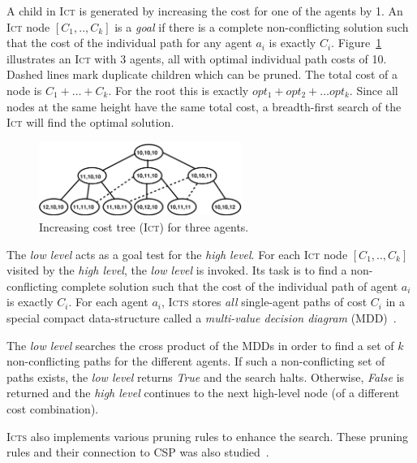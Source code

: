 \documentclass[jair,oneside,11pt]{article}
\begin{document}
A child in \textsc{Ict} is generated by increasing the cost for one of the agents by 1. An \textsc{Ict} node $[C_1,..,C_k]$ is a {\em goal} if there is a complete non-conflicting solution such that the cost of the
individual path for any agent $a_i$ is exactly $C_i$. Figure~\ref{figure-ICT}
illustrates an \textsc{Ict} with 3 agents, all with optimal individual path costs of 10.
Dashed lines mark duplicate children which can be pruned. The total cost of a
node is $C_1+ \ldots +C_k$. For the root this is exactly $opt_1
+ opt_2 + \ldots opt_k$. Since all nodes at the same height have the same total cost, a breadth-first search of
the \textsc{Ict} will find the optimal solution.

\begin{figure}
\begin{center}
\includegraphics*[height=2.4cm]{fig_ICT.pdf}
\end{center}
\vspace{-0.4cm}
\caption{Increasing cost tree (\textsc{Ict}) for three agents.} \label{figure-ICT}
\end{figure}

The \emph{low level} acts as a goal test for the \emph{high level}. For each
\textsc{Ict} node  $[C_1,..,C_k]$  visited by the \emph{high level}, the \emph{low level} is invoked.
Its task is to find a non-conflicting complete solution such that the cost of
the individual path of agent $a_i$ is exactly $C_i$. For each agent $a_i$, \textsc{Icts}
stores {\em all} single-agent paths of cost $C_i$ in a special compact
data-structure called a {\em multi-value decision diagram}
(MDD)~\cite{DBLP:conf/iccad/SrinivasanKMB90}.

The \emph{low level} searches the cross product of the MDDs in order to find a set of
$k$ non-conflicting paths for the different agents. If such a non-conflicting
set of paths exists, the \emph{low level} returns {\em True} and the search halts.
Otherwise, {\em False} is returned and the \emph{high level} continues to the next
high-level node (of a different cost combination).

\textsc{Icts} also implements various pruning rules to enhance the search. These pruning rules and their connection to CSP was also studied~\cite{DBLP:journals/ai/SharonSGF13}.
\end{document}
